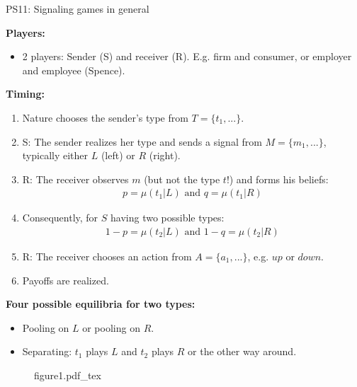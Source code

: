 \begin{frame}{PS11: Signaling games in general}
    \begin{multicols}{2}
      \textbf{Players:}\vspace{-8pt}
      \begin{itemize}
        \item 2 players: Sender (S) and receiver (R). E.g. firm and consumer, or employer and employee (Spence).
      \end{itemize}\vspace{-6pt}
      \textbf{Timing:}\vspace{-8pt}
      \begin{enumerate}
        \item Nature chooses the sender's type from $T=\{t_1,...\}$.
        \item S: The sender realizes her type and sends a signal from $M=\{m_1,...\}$, typically either $L$ (left) or $R$ (right).
        \item R: The receiver observes $m$ (but not the type $t$!) and forms his beliefs:\vspace{-5pt}
        \begin{align*}
          p=\mu(t_1|L)\text{ and }q=\mu(t_1|R)
        \end{align*}
        \item[] \vspace{-4pt} Consequently, for $S$ having two possible types:\vspace{-5pt}
        \begin{align*}
          1-p=\mu(t_2|L)\text{ and }1-q=\mu(t_2|R)
        \end{align*}
        \item \vspace{-4pt} R: The receiver chooses an action from $A=\{a_1,...\}$, e.g. $up$ or $down$.
        \item Payoffs are realized.
      \end{enumerate}\vspace{-6pt}
      \textbf{Four possible equilibria for two types:}\vspace{-6pt}
      \begin{itemize}
        \item Pooling on $L$ or pooling on $R$.
        \item Separating: $t_1$ plays $L$ and $t_2$ plays $R$ or the other way around.
      \end{itemize}
      \vfill\null\columnbreak
      \begin{figure}[!h]
        \center\def\svgwidth{\columnwidth}
        {figure1.pdf_tex}
      \end{figure}
      \vfill\null
    \end{multicols}
\end{frame}

